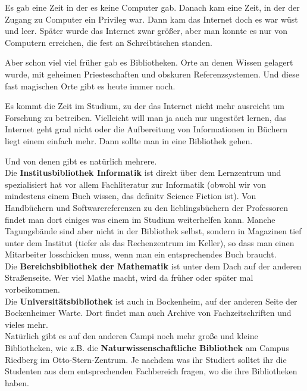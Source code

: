 \spaltenanfang

Es gab eine Zeit in der es keine Computer gab. Danach kam eine Zeit, in der der Zugang zu Computer ein Privileg war. Dann kam das Internet doch es war w\"ust und leer. Sp\"ater wurde das Internet zwar gr\"o{\ss}er, aber man konnte es nur von Computern erreichen, die fest an Schreibtischen standen.

Aber schon viel viel fr\"uher gab es Bibliotheken. Orte an denen Wissen gelagert wurde, mit geheimen Priesteschaften und obskuren Referenzsystemen. Und diese fast magischen Orte gibt es heute immer noch.

Es kommt die Zeit im Studium, zu der das Internet nicht mehr ausreicht um Forschung zu betreiben. Vielleicht will man ja auch nur ungest\"ort lernen, das Internet geht grad nicht oder die Aufbereitung von Informationen in B\"uchern liegt einem einfach mehr. Dann sollte man in eine Bibliothek gehen.

Und von denen gibt es nat\"urlich mehrere.\\
Die \textbf{Institusbibliothek Informatik} ist direkt \"uber dem Lernzentrum
und spezialisiert hat vor allem Fachliteratur zur Informatik (obwohl wir von
mindestens einem Buch wissen, das definitv Science Fiction ist). Von Handb\"uchern und
Softwarereferenzen zu den lieblingsb\"uchern der Professoren findet man dort
einiges was einem im Studium weiterhelfen kann. Manche Tagungsb\"ande sind aber nicht in der Bibliothek selbst,
sondern in Magazinen tief unter dem Institut (tiefer als das Rechenzentrum im Keller), so dass man einen Mitarbeiter losschicken muss, wenn man ein entsprechendes Buch braucht.\\
Die \textbf{Bereichsbibliothek der Mathematik} ist unter dem Dach auf der anderen Stra{\ss}enseite. Wer viel Mathe macht, wird da fr\"uher oder sp\"ater mal vorbeikommen.\\
Die \textbf{Universit\"atsbibliothek} ist auch in Bockenheim, auf der anderen Seite der Bockenheimer Warte. Dort findet man auch Archive von Fachzeitschriften und vieles mehr.\\
Nat\"urlich gibt es auf den anderen Campi noch mehr gro{\ss}e und kleine Bibliotheken, wie z.B. die \textbf{Naturwissenschaftliche Bibliothek} am Campus Riedberg im Otto-Stern-Zentrum. Je nachdem was ihr Studiert solltet ihr die Studenten aus dem entsprechenden Fachbereich fragen, wo die ihre Bibliotheken haben.

